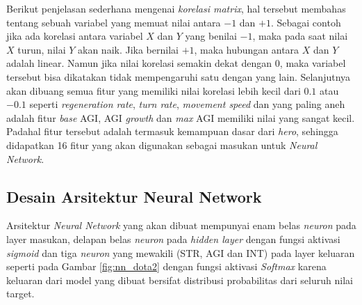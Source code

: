 Berikut penjelasan sederhana mengenai \textit{korelasi matrix}, hal tersebut membahas tentang sebuah variabel yang memuat nilai antara $-1$ dan $+1$. Sebagai contoh jika ada korelasi antara variabel $X$ dan $Y$ yang benilai $-1$, maka pada saat nilai $X$ turun, nilai $Y$ akan naik. Jika bernilai $+1$, maka hubungan antara $X$ dan $Y$ adalah linear. Namun jika nilai korelasi semakin dekat dengan $0$, maka variabel tersebut bisa dikatakan tidak mempengaruhi satu dengan yang lain. Selanjutnya akan dibuang semua fitur yang memiliki nilai korelasi lebih kecil dari $0.1$ atau $-0.1$ seperti \textit{regeneration rate}, \textit{turn rate}, \textit{movement speed} dan yang paling aneh adalah fitur \textit{base} AGI, AGI \textit{growth} dan \textit{max} AGI memiliki nilai yang sangat kecil. Padahal fitur tersebut adalah termasuk kemampuan dasar dari \textit{hero}, sehingga didapatkan 16 fitur yang akan digunakan sebagai masukan untuk \textit{Neural Network}.
\vspace{1ex}

\subsection{Desain Arsitektur Neural Network}
\label{sec:sub_sec3_dota2_arch}
\vspace{1ex}

Arsitektur \textit{Neural Network} yang akan dibuat mempunyai enam belas \textit{neuron} pada layer masukan, delapan belas \textit{neuron} pada \textit{hidden layer} dengan fungsi aktivasi \textit{sigmoid} dan tiga \textit{neuron} yang mewakili (STR, AGI dan INT) pada layer keluaran seperti pada Gambar \ref{fig:nn_dota2} dengan fungsi aktivasi \textit{Softmax} karena keluaran dari model yang dibuat bersifat distribusi probabilitas dari seluruh nilai target. 
\vspace{1ex}

